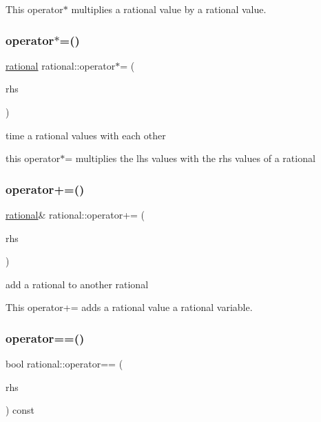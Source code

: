 This operator$\ast$ multiplies a rational value by a rational value. \mbox{\label{classrational_a2b5729aef261d16cd18ff7c7fcbf8c6e}} 
\subsubsection{\texorpdfstring{operator$\ast$=()}{operator*=()}}
{\footnotesize\ttfamily \hyperlink{classrational}{rational} rational\+::operator$\ast$= (\begin{DoxyParamCaption}\item[{const \hyperlink{classrational}{rational} \&}]{rhs }\end{DoxyParamCaption})\hspace{0.3cm}{\ttfamily [inline]}}



time a rational values with each other 

this operator$\ast$= multiplies the lhs values with the rhs values of a rational \mbox{\label{classrational_a9b83ad0c803d2ac242b42e71d954a356}} 
\subsubsection{\texorpdfstring{operator+=()}{operator+=()}}
{\footnotesize\ttfamily \hyperlink{classrational}{rational}\& rational\+::operator+= (\begin{DoxyParamCaption}\item[{const \hyperlink{classrational}{rational} \&}]{rhs }\end{DoxyParamCaption})\hspace{0.3cm}{\ttfamily [inline]}}



add a rational to another rational 

This operator+= adds a rational value a rational variable. \mbox{\label{classrational_a8b565720ea15ddfb17ea202e27698478}} 
\subsubsection{\texorpdfstring{operator==()}{operator==()}}
{\footnotesize\ttfamily bool rational\+::operator== (\begin{DoxyParamCaption}\item[{const \hyperlink{classrational}{rational} \&}]{rhs }\end{DoxyParamCaption}) const\hspace{0.3cm}{\ttfamily [inline]}}



